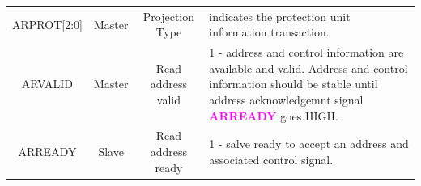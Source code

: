 \documentclass{article}
\newcommand{\AXISignals}[1]{\textbf{\textcolor{magenta}{#1}}}
\begin{document}
\begin{table}[H]
\begin{center}
\begin{tabular}{c|c|c|p{9.5cm}}
            ARPROT[2:0]      & Master          & Projection Type    & indicates the protection unit information transaction.                                                                                                                            \\
            ARVALID          & Master          & Read address valid & 1 - address and control information are available and valid. Address and control information should be stable until address acknowledgemnt signal \AXISignals{ARREADY} goes HIGH. \\
            ARREADY          & Slave           & Read address ready & 1 - salve ready to accept an address and associated control signal.                                                                                                               \\
        \end{tabular}
    \end{center}
\end{table}
\end{document}
